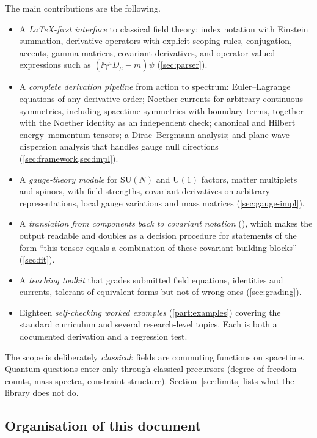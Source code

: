 The main contributions are the following.
\begin{itemize}[nosep]
\item A \emph{LaTeX-first interface} to classical field theory: index notation with Einstein summation, derivative operators with explicit scoping rules, conjugation, accents, gamma matrices, covariant derivatives, and operator-valued expressions such as $(\ii\gamma^\mu D_\mu-m)\psi$ (\cref{sec:parser}).
\item A \emph{complete derivation pipeline} from action to spectrum: Euler--Lagrange equations of any derivative order; Noether currents for arbitrary continuous symmetries, including spacetime symmetries with boundary terms, together with the Noether identity as an independent check; canonical and Hilbert energy--momentum tensors; a Dirac--Bergmann analysis; and plane-wave dispersion analysis that handles gauge null directions (\cref{sec:framework,sec:impl}).
\item A \emph{gauge-theory module} for $\mathrm{SU}(N)$ and $\mathrm U(1)$ factors, matter multiplets and spinors, with field strengths, covariant derivatives on arbitrary representations, local gauge variations and mass matrices (\cref{sec:gauge-impl}).
\item A \emph{translation from components back to covariant notation} (), which makes the output readable and doubles as a decision procedure for statements of the form ``this tensor equals a combination of these covariant building blocks'' (\cref{sec:fit}).
\item A \emph{teaching toolkit} that grades submitted field equations, identities and currents, tolerant of equivalent forms but not of wrong ones (\cref{sec:grading}).
\item Eighteen \emph{self-checking worked examples} (\cref{part:examples}) covering the standard curriculum and several research-level topics. Each is both a documented derivation and a regression test.
\end{itemize}

The scope is deliberately \emph{classical}: fields are commuting functions on spacetime. Quantum questions enter only through classical precursors (degree-of-freedom counts, mass spectra, constraint structure). Section~\ref{sec:limits} lists what the library does not do.

\subsection{Organisation of this document}

